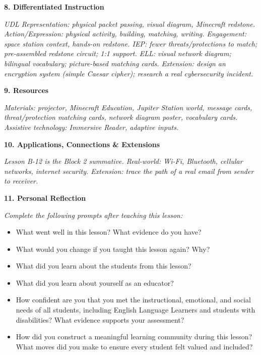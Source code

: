 \documentclass[11pt,letterpaper]{article}
\begin{document}
\textbf{8. Differentiated Instruction}

\textit{UDL Representation: physical packet passing, visual diagram, Minecraft redstone. Action/Expression: physical activity, building, matching, writing. Engagement: space station context, hands-on redstone. IEP: fewer threats/protections to match; pre-assembled redstone circuit; 1:1 support. ELL: visual network diagram; bilingual vocabulary; picture-based matching cards. Extension: design an encryption system (simple Caesar cipher); research a real cybersecurity incident.}

\textbf{9. Resources}

\textit{Materials: projector, Minecraft Education, Jupiter Station world, message cards, threat/protection matching cards, network diagram poster, vocabulary cards. Assistive technology: Immersive Reader, adaptive inputs.}

\textbf{10. Applications, Connections \& Extensions}

\textit{Lesson B-12 is the Block 2 summative. Real-world: Wi-Fi, Bluetooth, cellular networks, internet security. Extension: trace the path of a real email from sender to receiver.}

\textbf{11. Personal Reflection}

\textit{Complete the following prompts after teaching this lesson:}

\begin{itemize}
  \item What went well in this lesson? What evidence do you have?

  \item What would you change if you taught this lesson again? Why?

  \item What did you learn about the students from this lesson?

  \item What did you learn about yourself as an educator?

  \item How confident are you that you met the instructional, emotional, and social needs of all students, including English Language Learners and students with disabilities? What evidence supports your assessment?

  \item How did you construct a meaningful learning community during this lesson? What moves did you make to ensure every student felt valued and included?
\end{itemize}
\end{document}
